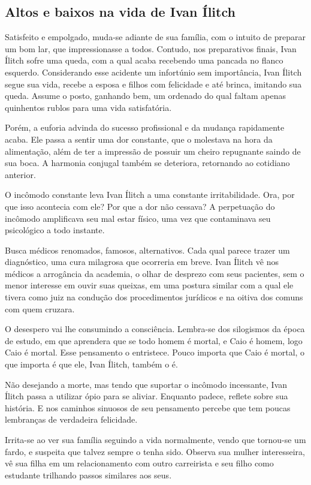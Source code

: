 \documentclass[12pt]{extarticle}
\begin{document}
\subsection{Altos e baixos na vida de Ivan Ílitch}

Satisfeito e empolgado, muda-se adiante de sua família, com o intuito de
preparar um bom lar, que impressionasse a todos. Contudo, nos preparativos finais, Ivan Ílitch sofre uma queda, com a
qual acaba recebendo uma pancada no flanco esquerdo. Considerando esse
acidente um infortúnio sem importância, Ivan Ílitch segue sua vida,
recebe a esposa e filhos com felicidade e até brinca, imitando sua
queda. Assume o posto, ganhando bem, um ordenado do qual faltam apenas
quinhentos rublos para uma vida satisfatória.

Porém, a euforia advinda
do sucesso profissional e da mudança rapidamente acaba. Ele passa a
sentir uma dor constante, que o molestava na hora da alimentação, além
de ter a impressão de possuir um cheiro repugnante saindo de sua boca. A
harmonia conjugal também se deteriora, retornando ao cotidiano anterior.

O incômodo constante leva Ivan Ílitch a uma constante irritabilidade.
Ora, por que isso acontecia com ele? Por que a dor não cessava? A
perpetuação do incômodo amplificava seu mal estar físico, uma vez que
contaminava seu psicológico a todo instante.

Busca médicos renomados, famosos, alternativos. Cada qual parece trazer
um diagnóstico, uma cura milagrosa que ocorreria em breve. Ivan Ílitch
vê nos médicos a arrogância da academia, o olhar de
desprezo com seus pacientes, sem o menor interesse em ouvir suas
queixas, em uma postura similar com a qual ele tivera como juiz na
condução dos procedimentos jurídicos e na oitiva dos comuns com quem
cruzara.

O desespero vai lhe consumindo a consciência. Lembra-se dos silogismos
da época de estudo, em que aprendera que se todo homem é mortal, e Caio
é homem, logo Caio é mortal. Esse pensamento o entristece. Pouco importa
que Caio é mortal, o que importa é que ele, Ivan Ílitch, também o é.

Não desejando a morte, mas tendo que suportar o incômodo incessante,
Ivan Ílitch passa a utilizar ópio para se aliviar. Enquanto padece,
reflete sobre sua história. E nos caminhos sinuosos de seu pensamento
percebe que tem poucas lembranças de verdadeira felicidade.

Irrita-se ao ver sua família seguindo a vida normalmente, vendo que
tornou-se um fardo, e suspeita que talvez sempre o tenha sido. Observa
sua mulher interesseira, vê sua filha em um relacionamento com outro
carreirista e seu filho como estudante trilhando passos similares aos
seus.
\end{document}
